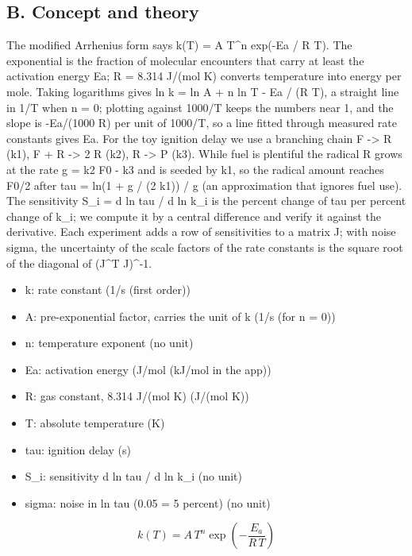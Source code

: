 \documentclass[11pt,a4paper]{article}
\begin{document}
\subsection*{B. Concept and theory}
The modified Arrhenius form says k(T) = A T\textasciicircum{}n exp(-Ea / R T). The exponential is the fraction of molecular encounters that carry at least the activation energy Ea; R = 8.314 J/(mol K) converts temperature into energy per mole. Taking logarithms gives ln k = ln A + n ln T - Ea / (R T), a straight line in 1/T when n = 0; plotting against 1000/T keeps the numbers near 1, and the slope is -Ea/(1000 R) per unit of 1000/T, so a line fitted through measured rate constants gives Ea. For the toy ignition delay we use a branching chain F -\textgreater{} R (k1), F + R -\textgreater{} 2 R (k2), R -\textgreater{} P (k3). While fuel is plentiful the radical R grows at the rate g = k2 F0 - k3 and is seeded by k1, so the radical amount reaches F0/2 after tau = ln(1 + g / (2 k1)) / g (an approximation that ignores fuel use). The sensitivity S\_i = d ln tau / d ln k\_i is the percent change of tau per percent change of k\_i; we compute it by a central difference and verify it against the derivative. Each experiment adds a row of sensitivities to a matrix J; with noise sigma, the uncertainty of the scale factors of the rate constants is the square root of the diagonal of (J\textasciicircum{}T J)\textasciicircum{}-1.

\begin{itemize}[nosep]
\item k: rate constant (1/s (first order))
\item A: pre-exponential factor, carries the unit of k (1/s (for n = 0))
\item n: temperature exponent (no unit)
\item Ea: activation energy (J/mol (kJ/mol in the app))
\item R: gas constant, 8.314 J/(mol K) (J/(mol K))
\item T: absolute temperature (K)
\item tau: ignition delay (s)
\item S\_i: sensitivity d ln tau / d ln k\_i (no unit)
\item sigma: noise in ln tau (0.05 = 5 percent) (no unit)
\end{itemize}

\begin{equation*}
k(T)=A\,T^{n}\exp\!\left(-\frac{E_a}{R\,T}\right)
\end{equation*}
\end{document}
